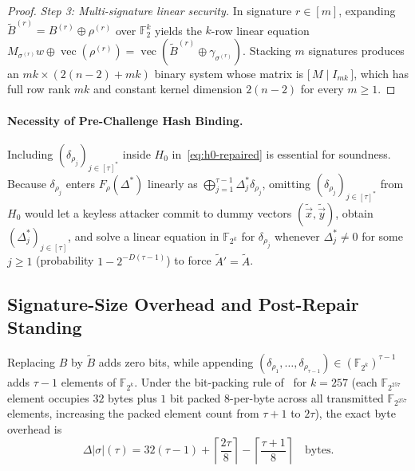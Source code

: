 \documentclass[11pt,a4paper]{article}
\theoremstyle{definition}
\theoremstyle{remark}
\newcommand{\Ftwo}{\mathbb{F}_2}
\newcommand{\Ftwok}{\mathbb{F}_{2^k}}
\newcommand{\FtwoN}{\mathbb{F}_{2^{257}}}
\newcommand{\vecF}{\operatorname{vec}}
\begin{document}
\begin{proof}
\smallskip\noindent
\emph{Step 3: Multi-signature linear security.}
In signature $r \in [m]$, expanding $\tilde{B}^{(r)} = B^{(r)} \oplus \rho^{(r)}$ over $\Ftwo^k$ yields the $k$-row linear equation $M_{\sigma^{(r)}} w \oplus \vecF(\rho^{(r)}) = \vecF(\tilde{B}^{(r)} \oplus \gamma_{\sigma^{(r)}})$. Stacking $m$ signatures produces an $mk \times (2(n-2) + mk)$ binary system whose matrix is $\big[\, M \;\big|\; I_{mk} \,\big]$, which has full row rank $mk$ and constant kernel dimension $2(n-2)$ for every $m \ge 1$.
\end{proof}

\paragraph{Necessity of Pre-Challenge Hash Binding.}
Including $(\delta_{\rho_j})_{j \in [\tau]^*}$ inside $H_0$ in~\eqref{eq:h0-repaired} is essential for soundness. Because $\delta_{\rho_j}$ enters $F_\rho(\Delta^*)$ linearly as $\bigoplus_{j=1}^{\tau-1} \Delta^*_j \delta_{\rho_j}$, omitting $(\delta_{\rho_j})_{j \in [\tau]^*}$ from $H_0$ would let a keyless attacker commit to dummy vectors $(\tilde{\vec{x}}, \tilde{\vec{y}})$, obtain $(\Delta^*_j)_{j \in [\tau]}$, and solve a linear equation in $\Ftwok$ for $\delta_{\rho_j}$ whenever $\Delta^*_j \neq 0$ for some $j \ge 1$ (probability $1 - 2^{-D(\tau-1)}$) to force $\tilde{A}' = \tilde{A}$.

\subsection{Signature-Size Overhead and Post-Repair Standing}
Replacing $B$ by $\tilde{B}$ adds zero bits, while appending $(\delta_{\rho_1}, \dots, \delta_{\rho_{\tau-1}}) \in (\Ftwok)^{\tau-1}$ adds $\tau - 1$ elements of $\Ftwok$. Under the bit-packing rule of~\cite{HJ25} for $k = 257$ (each $\FtwoN$ element occupies $32$ bytes plus $1$ bit packed $8$-per-byte across all transmitted $\FtwoN$ elements, increasing the packed element count from $\tau + 1$ to $2\tau$), the exact byte overhead is
\begin{equation}
\label{eq:delta-bytes}
\Delta |\sigma|(\tau) = 32(\tau - 1) + \left\lceil \frac{2\tau}{8} \right\rceil - \left\lceil \frac{\tau + 1}{8} \right\rceil \quad \text{bytes}.
\end{equation}
\end{document}
